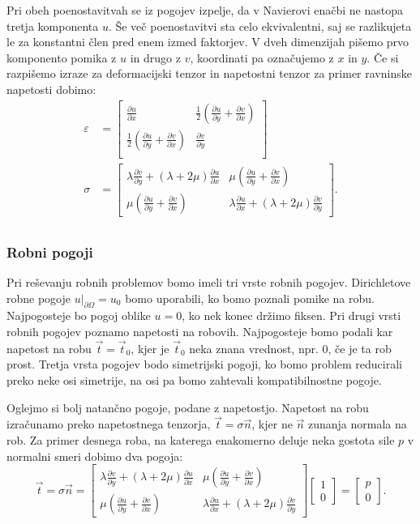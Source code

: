 \documentclass[12pt,a4paper]{article}
\theoremstyle{definition} %
\theoremstyle{plain} %
\numberwithin{equation}{section}
\newcommand{\eps}{\varepsilon}
\newcommand{\dpar}[2]{\ensuremath{\frac{\partial #1}{\partial #2}}}
\newcommand{\vt}{\vec{t}}
\newcommand{\vn}{\vec{n}}
\newcommand{\ts}{\sigma}
\begin{document}
Pri obeh poenostavitvah se iz pogojev izpelje, da v Navierovi enačbi ne nastopa
tretja komponenta $u$. Še več poenostavitvi sta celo ekvivalentni, saj se
razlikujeta le za konstantni člen pred enem izmed faktorjev. V dveh dimenzijah
pišemo prvo komponento pomika z $u$ in drugo z $v$, koordinati pa označujemo z
$x$ in $y$. Če si razpišemo izraze za deformacijski tenzor in napetostni tenzor
za primer ravninske napetosti dobimo:
\begin{align*}
  \eps &=
  \begin{bmatrix}
    \dpar{u}{x} & \frac12(\dpar{u}{y} + \dpar{v}{x}) \\
    \frac12(\dpar{u}{y} + \dpar{v}{x}) & \dpar{v}{y} \\
  \end{bmatrix}
  \\
  \ts &=
  \begin{bmatrix}
    \lambda \dpar{v}{y} + (\lambda+2\mu) \dpar{u}{x} &
    \mu(\dpar{u}{y} + \dpar{v}{x}) \\
    \mu(\dpar{u}{y} + \dpar{v}{x}) &
    \lambda \dpar{u}{x} + (\lambda+2\mu) \dpar{v}{y}
  \end{bmatrix}.
  \\
\end{align*}

\subsubsection{Robni pogoji}
Pri reševanju robnih problemov bomo imeli tri vrste robnih pogojev. Dirichletove
robne pogoje $u|_{\partial \Omega} = u_0$ bomo uporabili, ko bomo poznali
pomike na robu. Najpogosteje bo pogoj oblike $u = 0$, ko nek konec držimo
fiksen. Pri drugi vrsti robnih pogojev poznamo napetosti na robovih.
Najpogosteje bomo podali kar napetost na robu $\vt = \vt_0$, kjer je $\vt_0$
neka znana vrednost, npr. 0, če je ta rob prost. Tretja vrsta pogojev bodo
simetrijski pogoji, ko bomo problem reducirali preko neke osi simetrije, na osi
pa bomo zahtevali kompatibilnostne pogoje.

Oglejmo si bolj natančno pogoje, podane z napetostjo. Napetost na robu
izračunamo preko napetostnega tenzorja, $\vt = \ts\vn$, kjer ne $\vn$ zunanja
normala na rob. Za primer desnega roba, na katerega enakomerno deluje neka gostota
sile $p$ v normalni smeri dobimo dva pogoja:
\[
   \vt = \ts\vn =
  \begin{bmatrix}
    \lambda \dpar{v}{y} + (\lambda+2\mu) \dpar{u}{x} &
    \mu(\dpar{u}{y} + \dpar{v}{x}) \\
    \mu(\dpar{u}{y} + \dpar{v}{x}) &
    \lambda \dpar{u}{x} + (\lambda+2\mu) \dpar{v}{y}
  \end{bmatrix}
  \begin{bmatrix}
    1 \\ 0
  \end{bmatrix}
  =
  \begin{bmatrix}
    p \\ 0
  \end{bmatrix}.
\]
\end{document}
